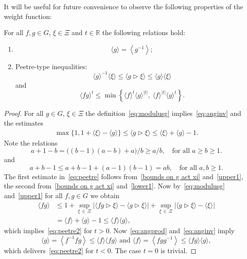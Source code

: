 \documentclass[AHL,Unicode,longabstracts,published]{cedram}
\newcommand{\R}{\mathbb R}
\newcommand{\act}{\triangleright}
\newcommand{\abs}[1]{\left\lvert #1 \right\rvert}
\newcommand{\ang}[1]{\langle #1 \rangle}
\begin{document}
It will be useful for future convenience to observe the following properties of the weight function:
\begin{lemm}
For all $f,g \in G$, $\xi \in \Xi$ and $t \in\R$ the following relations hold:
\begin{enumerate}
\item
\begin{equation}
\ang g = \left\langle g^{-1}\right\rangle;\label{eq:anginv}
\end{equation}
\item Peetre-type inequalities:
\begin{equation}
\ang g^{-1} \ang \xi \le \ang{g \act \xi} \le \ang g \ang \xi\label{eq:peetre}
\end{equation}
and
\begin{equation}
\ang{fg}^t \le \min\left\{\ang f^t \ang g^{\abs t}, \ \ang f^{\abs t} \ang g^{t}\right\}.\label{eq:peetre2}
\end{equation}
\end{enumerate}
\end{lemm}

\begin{proof}
For all $g \in G$, $\xi \in \Xi$ the definition~\eqref{eq:modulusg} implies~\eqref{eq:anginv} and the estimates
\begin{align}\label{bounds on g act xi}
\max\big\{1, 1 +\ang{\xi} -\ang{g}\big\} \leq \ang{g\act \xi} \leq \ang\xi +\ang g -1.
\end{align}
Note the relations
\begin{equation}\label{upper1}
a +1 -b =\big((b -1)(a -b) +a\big)/b \geq a/b,\quad \text{for all } a\geq b\geq 1.
\end{equation}
and
\begin{equation}\label{lower1}
a +b -1 \leq a +b -1 +(a -1)(b -1) =ab,\quad \text{for all } a, b\geq 1.
\end{equation}
The first estimate in~\eqref{eq:peetre} follows from~\eqref{bounds on g act xi} and~\eqref{upper1}, the second from~\eqref{bounds on g act xi} and~\eqref{lower1}. Now by~\eqref{eq:modulusg} and~\eqref{upper1} for all $f,g \in G$ we obtain
\begin{equation}\label{eq:angprod}
\begin{aligned}
\ang{fg}&\leq 1 +\sup_{\xi\,\in\,\Xi} \left|\ang{fg\act\xi} - \ang{g\act \xi}\right| +\sup_{\xi\,\in\,\Xi}\left|\ang{g\act\xi} - \ang{\xi}\right| \\
&=\ang f +\ang g -1 \leq \ang f\ang g,
\end{aligned}
\end{equation}
which implies~\eqref{eq:peetre2} for $t >0$. Now~\eqref{eq:angprod} and~\eqref{eq:anginv} imply
\begin{equation}
\ang g =\left\langle f^{-1}fg\right\rangle \leq\ang f\ang{fg}\text{ and }\ang f =\left\langle fgg^{-1}\right\rangle \leq \ang{fg}\ang{g},
\end{equation}
which delivers~\eqref{eq:peetre2} for $t < 0$. The case $t = 0$ is trivial.
\end{proof}
\end{document}
